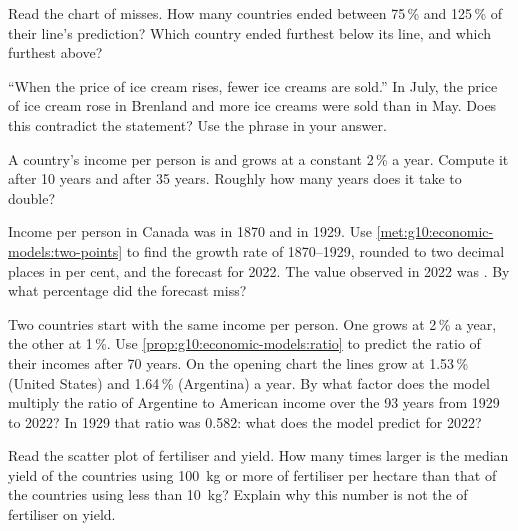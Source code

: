 \begin{exercise}[$\star$]\label{exo:g10:economic-models:4}
Read the chart of misses. How many countries ended between 75\,\% and 125\,\% of their line's
prediction? Which country ended furthest below its line, and which furthest above?
\end{exercise}

\begin{exercise}[$\star$]\label{exo:g10:economic-models:5}
``When the price of ice cream rises, fewer ice creams are sold.'' In July, the price of ice cream
rose in Brenland and more ice creams were sold than in May. Does this contradict the statement?
Use the phrase \emph{} in your answer.
\end{exercise}

\begin{exercise}[$\star\star$]\label{exo:g10:economic-models:6}
A country's income per person is  and grows at a constant 2\,\% a year. Compute it after
10 years and after 35 years. Roughly how many years does it take to double?
\end{exercise}

\begin{exercise}[$\star\star$]\label{exo:g10:economic-models:7}
Income per person in Canada was  in 1870 and  in 1929. Use
\cref{met:g10:economic-models:two-points} to find the growth rate of 1870--1929, rounded to two
decimal places in per cent, and the forecast for 2022. The value observed in 2022 was .
By what percentage did the forecast miss?
\end{exercise}

\begin{exercise}[$\star\star$]\label{exo:g10:economic-models:8}
Two countries start with the same income per person. One grows at 2\,\% a year, the other at 1\,\%.
Use \cref{prop:g10:economic-models:ratio} to predict the ratio of their incomes after 70 years.
On the opening chart the lines grow at 1.53\,\% (United States) and 1.64\,\% (Argentina) a year.
By what factor does the model multiply the ratio of Argentine to American income over the 93 years
from 1929 to 2022? In 1929 that ratio was 0.582: what does the model predict for 2022?
\end{exercise}

\begin{exercise}[$\star\star$]\label{exo:g10:economic-models:9}
Read the scatter plot of fertiliser and yield. How many times larger is the median yield of the
countries using \qty{100}{kg} or more of fertiliser per hectare than that of the countries using
less than \qty{10}{kg}? Explain why this number is not the  of fertiliser on yield.
\end{exercise}

